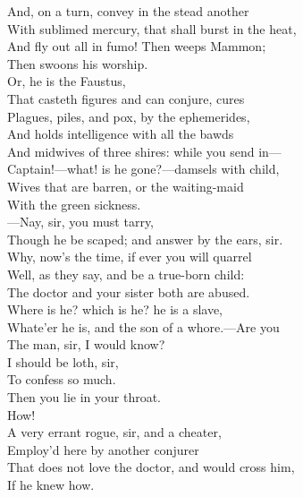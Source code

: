\documentclass[a4paper,oneside]{memoir}
\begin{document}
\begin{drama*}
And, on a turn, convey in the stead another\\
With sublimed mercury, that shall burst in the heat,\\
And fly out all in fumo! Then weeps Mammon;\\
Then swoons his worship.\\
 Or, he is the Faustus,\\
That casteth figures and can conjure, cures\\
Plagues, piles, and pox, by the ephemerides,\\
And holds intelligence with all the bawds\\
And midwives of three shires: while you send in---\\
Captain!---what! is he gone?---damsels with child,\\
Wives that are barren, or the waiting-maid\\
With the green sickness.\\
 ---Nay, sir, you must tarry,\\
Though he be scaped; and answer by the ears, sir.\\
\facespeaks Why, now's the time, if ever you will quarrel\\
Well, as they say, and be a true-born child:\\
The doctor and your sister both are abused.\\
\kastrilspeaks Where is he? which is he? he is a slave,\\
Whate'er he is, and the son of a whore.---Are you\\
The man, sir, I would know?\\
\surlyspeaks {} I should be loth, sir,\\
To confess so much.\\
\kastrilspeaks {} Then you lie in your throat.\\
\surlyspeaks {} How!\\
\facespeaks {} A very errant rogue, sir, and a cheater,\\
Employ'd here by another conjurer\\
That does not love the doctor, and would cross him,\\
If he knew how.\\

\end{drama*}
\end{document}
